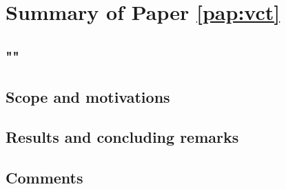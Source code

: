 \section{Summary of Paper \ref{pap:vct}}
\subsection*{""}
\subsection*{Scope and motivations}

\subsection*{Results and concluding remarks}
\subsection*{Comments}
\clearpage